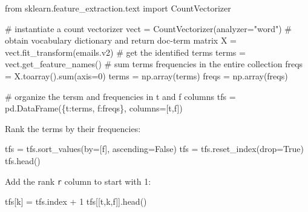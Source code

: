 \documentclass[
  letterpaper,
]{scrbook}
\newenvironment{Shaded}{\begin{snugshade}}{\end{snugshade}}
\newcommand{\BuiltInTok}[1]{\textcolor[rgb]{0.00,0.23,0.31}{#1}}
\newcommand{\CommentTok}[1]{\textcolor[rgb]{0.37,0.37,0.37}{#1}}
\newcommand{\DecValTok}[1]{\textcolor[rgb]{0.68,0.00,0.00}{#1}}
\newcommand{\ImportTok}[1]{\textcolor[rgb]{0.00,0.46,0.62}{#1}}
\newcommand{\NormalTok}[1]{\textcolor[rgb]{0.00,0.23,0.31}{#1}}
\newcommand{\OperatorTok}[1]{\textcolor[rgb]{0.37,0.37,0.37}{#1}}
\newcommand{\StringTok}[1]{\textcolor[rgb]{0.13,0.47,0.30}{#1}}
\newcommand{\VariableTok}[1]{\textcolor[rgb]{0.07,0.07,0.07}{#1}}
\begin{document}
\begin{Shaded}
\begin{Highlighting}[]
\ImportTok{from}\NormalTok{ sklearn.feature\_extraction.text }\ImportTok{import}\NormalTok{ CountVectorizer}

\CommentTok{\# instantiate a count vectorizer}
\NormalTok{vect }\OperatorTok{=}\NormalTok{ CountVectorizer(analyzer}\OperatorTok{=}\StringTok{"word"}\NormalTok{)}
\CommentTok{\# obtain vocabulary dictionary and return doc{-}term matrix}
\NormalTok{X }\OperatorTok{=}\NormalTok{ vect.fit\_transform(emails.v2) }
\CommentTok{\# get the identified terms}
\NormalTok{terms }\OperatorTok{=}\NormalTok{ vect.get\_feature\_names()}
\CommentTok{\# sum terms\textquotesingle{} frequencies in the entire collection}
\NormalTok{freqs }\OperatorTok{=}\NormalTok{ X.toarray().}\BuiltInTok{sum}\NormalTok{(axis}\OperatorTok{=}\DecValTok{0}\NormalTok{)}
\NormalTok{terms }\OperatorTok{=}\NormalTok{ np.array(terms)}
\NormalTok{freqs }\OperatorTok{=}\NormalTok{ np.array(freqs)}

\CommentTok{\# organize the tersm and frequencies in t and f columns}
\NormalTok{tfs }\OperatorTok{=}\NormalTok{ pd.DataFrame(\{}\StringTok{\textquotesingle{}t\textquotesingle{}}\NormalTok{:terms, }\StringTok{\textquotesingle{}f\textquotesingle{}}\NormalTok{:freqs\}, columns}\OperatorTok{=}\NormalTok{[}\StringTok{\textquotesingle{}t\textquotesingle{}}\NormalTok{,}\StringTok{\textquotesingle{}f\textquotesingle{}}\NormalTok{])}
\end{Highlighting}
\end{Shaded}

Rank the terms by their frequencies:

\begin{Shaded}
\begin{Highlighting}[]
\NormalTok{tfs }\OperatorTok{=}\NormalTok{ tfs.sort\_values(by}\OperatorTok{=}\NormalTok{[}\StringTok{\textquotesingle{}f\textquotesingle{}}\NormalTok{], ascending}\OperatorTok{=}\VariableTok{False}\NormalTok{)}
\NormalTok{tfs }\OperatorTok{=}\NormalTok{ tfs.reset\_index(drop}\OperatorTok{=}\VariableTok{True}\NormalTok{)}
\NormalTok{tfs.head()}
\end{Highlighting}
\end{Shaded}

Add the rank \texttt{r} column to start with 1:

\begin{Shaded}
\begin{Highlighting}[]
\NormalTok{tfs[}\StringTok{\textquotesingle{}k\textquotesingle{}}\NormalTok{] }\OperatorTok{=}\NormalTok{ tfs.index }\OperatorTok{+} \DecValTok{1}
\NormalTok{tfs[[}\StringTok{\textquotesingle{}t\textquotesingle{}}\NormalTok{,}\StringTok{\textquotesingle{}k\textquotesingle{}}\NormalTok{,}\StringTok{\textquotesingle{}f\textquotesingle{}}\NormalTok{]].head()}
\end{Highlighting}
\end{Shaded}
\end{document}
